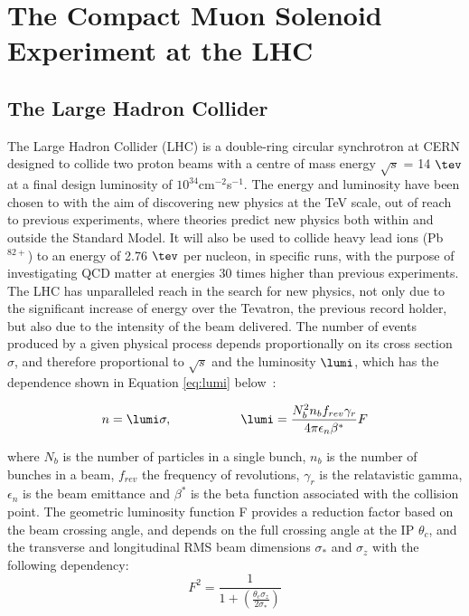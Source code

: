 \chapter{The Compact Muon Solenoid Experiment at the LHC}
\label{ch:detector}
\section{The Large Hadron Collider}

The Large Hadron Collider (LHC) is a double-ring circular synchrotron at CERN designed to collide two proton beams with a centre of mass energy $\sqrt{s}$  = 14 $\tev$ at a final design luminosity of $10^{34}$cm$^{-2}$s$^{-1}$. The energy and luminosity have been chosen to with the aim of discovering new physics at the TeV scale, out of reach to previous experiments, where theories predict new physics both within and outside the Standard Model. It will also be used to collide heavy lead ions (Pb$^{82+}$) to an energy of 2.76 $\tev$  per nucleon, in specific runs, with the purpose of investigating QCD matter at energies 30 times higher than previous experiments. 
The LHC has unparalleled reach in the search for new physics, not only due to the significant increase of energy over the Tevatron, the previous record holder, but also due to the intensity of the beam delivered. The number of events produced by a given physical process depends proportionally on its cross section $\sigma$, and therefore proportional to $\sqrt{s}$ and the luminosity $\lumi$, which has the dependence shown in Equation \ref{eq:lumi} below~\cite{LHCDesign}:

\begin{equation}
n = \lumi \sigma, \hspace{.75in} \lumi = \frac{N_{b}^{2} n_{b} f_{rev} \gamma_{r}}{4 \pi \epsilon_{n} \beta^{*}}F
\label{eq:lumi}
\end{equation}

where $N_{b}$ is the number of particles in a single bunch, $n_{b}$ is the number of bunches in a beam, $f_{rev}$ the frequency of revolutions, $\gamma_{r}$ is the relatavistic gamma, $\epsilon_{n}$ is the beam emittance and $\beta^{*}$ is the beta function associated with the collision point. The geometric luminosity function F provides a reduction factor based on the beam crossing angle, and depends on the full crossing angle at the IP $\theta_{c}$, and the transverse and longitudinal RMS beam dimensions $\sigma_{*}$ and $\sigma_{z}$ with the following dependency:
\begin{equation}
F^{2} = \frac{1}{1+(\frac{\theta_{c} \sigma_{z}}{2\sigma_{*}})}
\label{eq:lumi2}
\end{equation}


